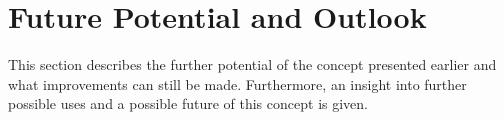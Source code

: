 
\section{Future Potential and Outlook}\label{sec::outlook}
This section describes the further potential of the concept presented earlier and what improvements can still be made. Furthermore, an insight into further possible uses and a possible future of this concept is given.


